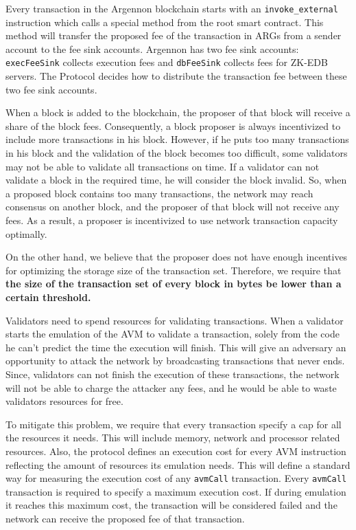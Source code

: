 


Every transaction in the Argennon blockchain starts with an \texttt{invoke\_external} instruction which calls a
special method from the root smart contract. This method will transfer the proposed fee of the transaction in ARGs
from a sender account to the fee sink accounts. Argennon has two fee sink accounts: \texttt{execFeeSink} collects
execution fees and \texttt{dbFeeSink} collects fees for ZK-EDB servers. The Protocol decides how to distribute the
transaction fee between these two fee sink accounts.

When a block is added to the blockchain, the proposer of that block will receive a share of the block fees.
Consequently, a block proposer is always incentivized to include more transactions in his block. However, if he
puts too many transactions in his block and the validation of the block becomes too difficult, some validators
may not be able to validate all transactions on time. If a validator can not validate a block in the required
time, he will consider the block invalid. So, when a proposed block contains too many transactions, the network
may reach consensus on another block, and the proposer of that block will not receive any fees. As a result, a
proposer is incentivized to use network transaction capacity optimally.

On the other hand, we believe that the proposer does not have enough incentives for optimizing the storage size
of the transaction set. Therefore, we require that \textbf{the size of the transaction set of every block in
bytes be lower than a certain threshold.}

Validators need to spend resources for validating transactions. When a validator starts the emulation of the AVM
to validate a transaction, solely from the code he can't predict the time the execution will finish. This will
give an adversary an opportunity to attack the network by broadcasting transactions that never ends. Since,
validators can not finish the execution of these transactions, the network will not be able to charge the
attacker any fees, and he would be able to waste validators resources for free.

To mitigate this problem, we require that every transaction specify a cap for all the resources it needs. This
will include memory, network and processor related resources. Also, the protocol defines an execution cost for
every AVM instruction reflecting the amount of resources its emulation needs. This will define a standard way for
measuring the execution cost of any \texttt{avmCall} transaction. Every \texttt{avmCall} transaction is required
to specify a maximum execution cost. If during emulation it reaches this maximum cost, the transaction will be
considered failed and the network can receive the proposed fee of that transaction.


